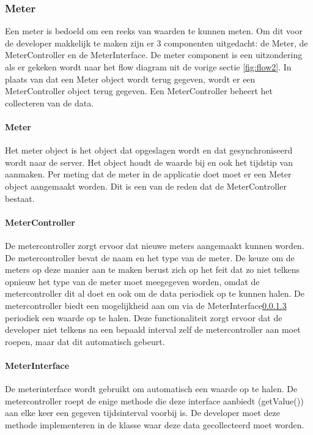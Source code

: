\subsubsection{Meter}
Een meter is bedoeld om een reeks van waarden te kunnen meten. Om dit voor de developer makkelijk te maken zijn er  3 componenten uitgedacht: de Meter, de MeterController en de MeterInterface. De meter component is een uitzondering als er gekeken wordt naar het flow diagram uit de vorige sectie \ref{fig:flow2}. In plaats van dat een Meter object wordt terug gegeven, wordt er een MeterController object terug gegeven. Een MeterController beheert het collecteren van de data. 

\paragraph{Meter}
Het meter object is het object dat opgeslagen wordt en dat gesynchroniseerd wordt naar de server. Het object houdt de waarde bij en ook het tijdstip van aanmaken. Per meting dat de meter in de applicatie doet moet er een Meter object aangemaakt worden. Dit is een van de reden dat de MeterController bestaat. 

\paragraph{MeterController}
De metercontroller zorgt ervoor dat nieuwe meters aangemaakt kunnen worden. De metercontroller bevat de naam en het type van de meter. De keuze om de meters op deze manier aan te maken berust zich op het feit dat zo niet telkens opnieuw het type van de meter moet meegegeven worden, omdat de metercontroller dit al doet en ook om de data periodiek op te kunnen halen. De metercontroller biedt een mogelijkheid aan om via de MeterInterface\ref{Klassediagram:MeterInferface} periodiek een waarde op te halen. Deze functionaliteit zorgt ervoor dat de developer niet telkens na een bepaald interval zelf de metercontroller aan moet roepen, maar dat dit automatisch gebeurt.

\paragraph{MeterInterface}\label{Klassediagram:MeterInferface}
De meterinterface wordt gebruikt om automatisch een waarde op te halen. De metercontroller roept de enige methode die deze interface aanbiedt (getValue()) aan elke keer een gegeven tijdsinterval voorbij is. De developer moet deze methode implementeren in de klasse waar deze data gecollecteerd moet worden.  



